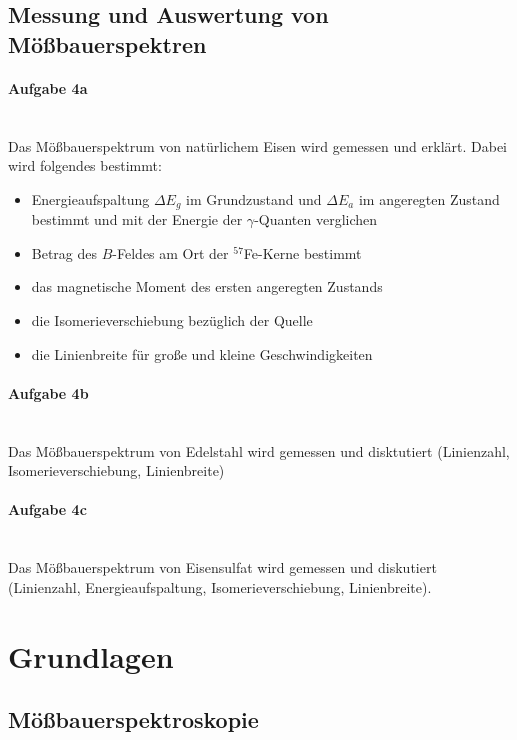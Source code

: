 \documentclass[a4paper,twoside,final]{article}
\begin{document}
\subsection{Messung und Auswertung von Mößbauerspektren}
\paragraph{Aufgabe 4a}$~$\\
Das Mößbauerspektrum von natürlichem Eisen wird gemessen und erklärt.
Dabei wird folgendes bestimmt:
\begin{itemize}
  \item Energieaufspaltung $\Delta E_g$ im Grundzustand und $\Delta E_a$ im angeregten Zustand bestimmt und mit der Energie der $\gamma$-Quanten verglichen
  \item Betrag des $B$-Feldes am Ort der $^{57}$Fe-Kerne bestimmt
  \item das magnetische Moment des ersten angeregten Zustands
  \item die Isomerieverschiebung bezüglich der Quelle
  \item die Linienbreite für große und kleine Geschwindigkeiten
\end{itemize}
\paragraph{Aufgabe 4b}$~$\\
Das Mößbauerspektrum von Edelstahl wird gemessen und disktutiert (Linienzahl, Isomerieverschiebung, Linienbreite)
\paragraph{Aufgabe 4c}$~$\\
Das Mößbauerspektrum von Eisensulfat wird gemessen und diskutiert (Linienzahl, Energieaufspaltung, Isomerieverschiebung, Linienbreite).
\newpage
\section{Grundlagen} \label{sec:Grundlagen}
\subsection{Mößbauerspektroskopie}
\end{document}
